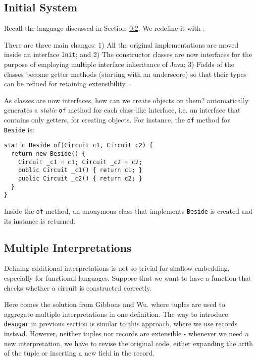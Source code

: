 \subsection{Initial System}
Recall the \dsl language discussed in Section~\ref{}.
We redefine it with \name:


There are three main changes:
1) All the original implementations are moved inside an interface \texttt{Init}; and
2) The constructor classes are now interfaces for the purpose of employing
multiple interface inheritance of Java;
3) Fields of the classes become getter methods (starting with an underscore) so that their types can be refined for retaining extensibility~\cite{}.

As classes are now interfaces, how can we create objects on them?
\name automatically generates a \emph{static} \texttt{of} method for each
class-like interface, i.e. an interface that contains only getters, for creating objects.
For instance, the \texttt{of} method for \texttt{Beside} is:
\begin{lstlisting}
static Beside of(Circuit c1, Circuit c2) {
  return new Beside() {
    Circuit _c1 = c1; Circuit _c2 = c2;
    public Circuit _c1() { return c1; }
    public Circuit _c2() { return c2; }
  }
}
\end{lstlisting}
Inside the \texttt{of} method, an anonymous class that implements
\texttt{Beside} is created and its instance is returned.

\subsection{Multiple Interpretations}
Defining additional interpretations is not so trivial for shallow embedding,
especially for functional languages.
Suppose that we want to have a function that checks whether a circuit is constructed correctly.

Here comes the solution from Gibbons and Wu.
where tuples are used to aggregate multiple interpretations in one definition.
The way to introduce \texttt{desugar} in previous section is similar to this
approach, where we use records instead.
However, neither tuples nor records are extensible - whenever we need a new
interpretation, we have to revise the original code, either expanding the arith of the
tuple or inserting a new field in the record.

